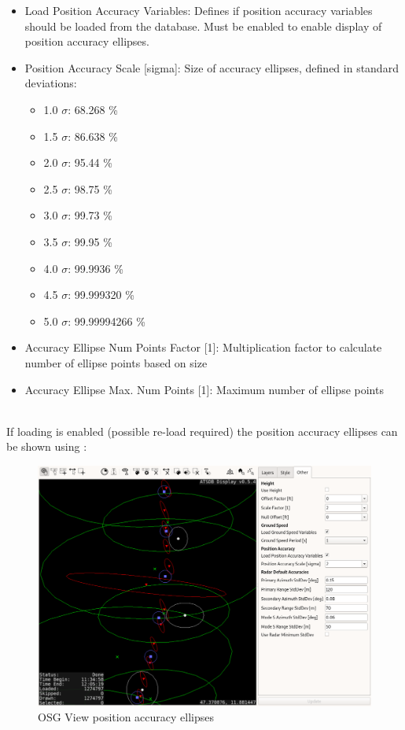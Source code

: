 \begin{itemize}
 \item Load Position Accuracy Variables: Defines if position accuracy variables should be loaded from the database. Must be enabled to enable display of position accuracy ellipses.
 \item Position Accuracy Scale [sigma]: Size of accuracy ellipses, defined in standard deviations:
 \begin{itemize}
    \item 1.0 $\sigma$: 68.268 \%
    \item 1.5 $\sigma$: 86.638 \%
    \item 2.0 $\sigma$: 95.44 \%
    \item 2.5 $\sigma$: 98.75 \%
    \item 3.0 $\sigma$: 99.73 \%
    \item 3.5 $\sigma$: 99.95 \%
    \item 4.0 $\sigma$: 99.9936 \%
    \item 4.5 $\sigma$: 99.999320 \%
    \item 5.0 $\sigma$: 99.99994266 \%
\end{itemize}  
\item Accuracy Ellipse Num Points Factor [1]: Multiplication factor to calculate number of ellipse points based on size
\item Accuracy Ellipse Max. Num Points [1]: Maximum number of ellipse points
\end{itemize}
\ \\

If loading is enabled (possible re-load required) the position accuracy ellipses can be shown using :

\begin{figure}[H]
    \hspace*{-2.5cm}
    \includegraphics[width=19cm,frame]{figures/osgview_accuracy_ellipses.png}
  \caption{OSG View position accuracy ellipses}
\end{figure} 

